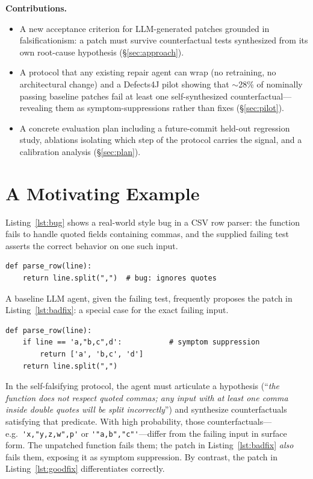 \documentclass[sigconf,review,anonymous,nonacm]{acmart}
\begin{document}
\smallskip\noindent\textbf{Contributions.}
\begin{itemize}
\item A new acceptance criterion for LLM-generated patches grounded in
falsificationism: a patch must survive counterfactual tests synthesized
from its own root-cause hypothesis (\S\ref{sec:approach}).
\item A protocol that any existing repair agent can wrap (no retraining,
no architectural change) and a Defects4J pilot showing that $\sim$28\%
of nominally passing baseline patches fail at least one self-synthesized
counterfactual---revealing them as symptom-suppressions rather than
fixes (\S\ref{sec:pilot}).
\item A concrete evaluation plan including a future-commit held-out
regression study, ablations isolating which step of the protocol carries
the signal, and a calibration analysis (\S\ref{sec:plan}).
\end{itemize}

\section{A Motivating Example}
\label{sec:motivation}

Listing~\ref{lst:bug} shows a real-world style bug in a CSV row parser:
the function fails to handle quoted fields containing commas, and the
supplied failing test asserts the correct behavior on one such input.

\begin{lstlisting}[caption={A bug whose failing test is a single
quoted-comma input.},label={lst:bug}]
def parse_row(line):
    return line.split(",")  # bug: ignores quotes
\end{lstlisting}

A baseline LLM agent, given the failing test, frequently proposes the
patch in Listing~\ref{lst:badfix}: a special case for the exact failing
input.

\begin{lstlisting}[caption={A symptom-suppressing ``fix.'' Passes the
failing test. Wrong on every other quoted-comma input.},label={lst:badfix}]
def parse_row(line):
    if line == 'a,"b,c",d':           # symptom suppression
        return ['a', 'b,c', 'd']
    return line.split(",")
\end{lstlisting}

In the self-falsifying protocol, the agent must articulate a hypothesis
(``\emph{the function does not respect quoted commas; any input with at
least one comma inside double quotes will be split incorrectly}'') and
synthesize counterfactuals satisfying that predicate. With high
probability, those counterfactuals---e.g.\ \verb|'x,"y,z,w",p'| or
\verb|'"a,b","c"'|---differ from the failing input in surface form.
The unpatched function fails them; the patch in Listing~\ref{lst:badfix}
\emph{also} fails them, exposing it as symptom suppression. By contrast,
the patch in Listing~\ref{lst:goodfix} differentiates correctly.
\end{document}

